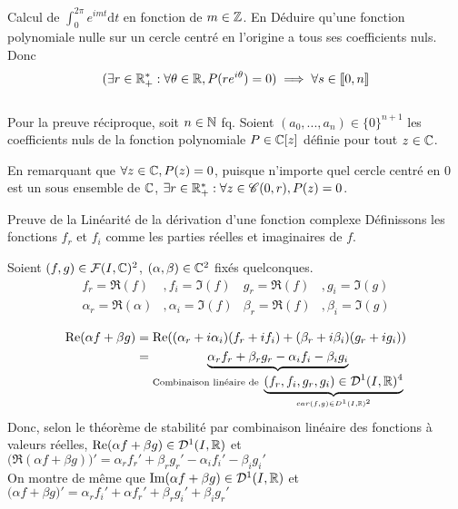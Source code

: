 \documentclass{article}
\renewenvironment{question_kholle}[2][ ]
{
	\subsection{\texorpdfstring{#2}{}}
	\notblank{#1}
	{
		\noindent #1
		\bigbreak
	}
	{}
	\begin{proof}
}
{
	\end{proof}
}
\begin{document}
\begin{question_kholle}{Calcul de $\int_0^{2\pi}e^{imt} \mathrm d t$ en fonction de $m \in \mathbb Z$. En Déduire qu'une fonction polynomiale nulle sur un cercle centré en l'origine a tous ses coefficients nuls.}
  Donc $$
    (\exists r \in \mathbb R_+^* : \forall \theta \in \mathbb R, P(re^{i\theta})=0) \implies \forall s \in [ \! [0, n] \! ]
  $$
  \\
  Pour la preuve réciproque,  soit $n \in \mathbb N$ fq. Soient $(a_0,...,a_n) \in \{ 0 \} ^{n+1}$ les coefficients nuls de la fonction polynomiale $P \in \mathbb C[z]$ définie pour tout $z \in \mathbb C$.

  En remarquant que $\forall z \in \mathbb C , P(z) = 0$, puisque n'importe quel cercle centré en 0 est un sous ensemble de $\mathbb C$,  $\exists r \in \mathbb R_+^*: \forall z \in \mathscr C(0, r), P(z) = 0$.
\end{question_kholle}

\begin{question_kholle}{Preuve de la Linéarité de la dérivation d'une fonction complexe}
  Définissons les fonctions $f_r$ et $f_i$ comme les parties réelles et imaginaires de $f$.

  Soient $(f, g) \in \mathcal{F}(I, \mathbb C)^2$, $(\alpha, \beta) \in \mathbb C^2$ fixés quelconques.
  \begin{align*}
    f_r = \Re(f)           & , f_i = \Im(f)      & g_r = \Re(f)     & , g_i = \Im(g)     \\
    \alpha_r = \Re(\alpha) & , \alpha_i = \Im(f) & \beta_r = \Re(f) & , \beta_i = \Im(g)
  \end{align*}

  \begin{align*}
    \text{Re}( \alpha f + \beta g) & = \text{Re}((\alpha_r + i \alpha_i)(f_r + i f_i) + (\beta_r+ i\beta_i)(g_r+ i g_i))                                                                                                                     \\
                             & = \underbrace{\alpha_r f_r + \beta_r g_r - \alpha_i f_i - \beta_i g_i}_{\text{Combinaison linéaire de } \underbrace{(f_r, f_i, g_r, g_i) \in \mathcal D^1(I, \mathbb R)^4}_{car (f,g) \in D^1(I, \mathbb R)^2}}
  \end{align*}
  Donc, selon le théorème de stabilité par combinaison linéaire des fonctions à valeurs réelles, $\text{Re}(\alpha f + \beta g) \in \mathcal D^1(I, \mathbb R)$ et $\big(\Re(\alpha f + \beta g)\big)' = \alpha_r f_r' + \beta_r g_r' - \alpha_i f_i' - \beta_i g_i'$
  \\
  On montre de même que $\text{Im}(\alpha f + \beta g) \in \mathcal D^1(I, \mathbb R)$ et $\big(\alpha f + \beta g\big)' = \alpha_r f_i' +\alpha f_r' +\beta_r g_i' +\beta_i g_r'$


\end{question_kholle}
\end{document}

